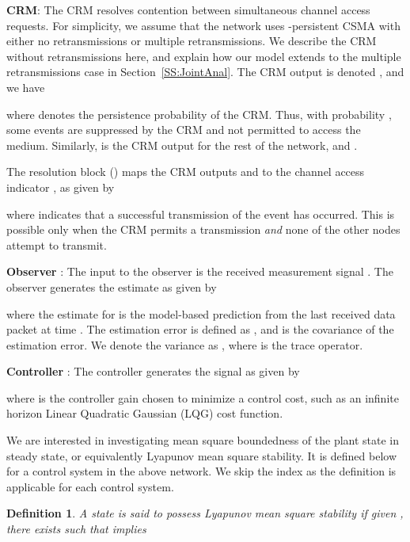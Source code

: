 \documentclass[twocolumn]{autart}
\newtheorem{definition}{Definition}[section]
\begin{document}
\noindent \textbf{CRM}: The CRM resolves contention between simultaneous channel access requests. For simplicity, we assume that the network uses -persistent CSMA with either no retransmissions or multiple retransmissions. We describe the CRM without retransmissions here, and explain how our model extends to the multiple retransmissions case in Section~\ref{SS:JointAnal}. The CRM output is denoted , and we have

where  denotes the persistence probability of the CRM. Thus, with probability , some events are suppressed by the CRM and not permitted to access the medium. Similarly,  is the CRM output for the rest of the network, and .

The resolution block () maps the CRM outputs  and  to the channel access indicator , as given by

where  indicates that a successful transmission of the event has occurred. This is possible only when the CRM permits a transmission \emph{and} none of the other nodes attempt to transmit.

\noindent \textbf{Observer} : The input to the observer is the received measurement signal . The observer generates the estimate  as given by

where the estimate for  is the model-based prediction from the last received data packet at time . The estimation error is defined as , and  is the covariance of the estimation error. We denote the variance as , where  is the trace operator.

\noindent \textbf{Controller} : The controller generates the signal  as given by

where  is the controller gain chosen to minimize a control cost, such as an infinite horizon Linear Quadratic Gaussian (LQG) cost function. 

We are interested in investigating mean square boundedness of the plant state in steady state, or equivalently Lyapunov mean square stability. It is defined below for a control system in the above network. We skip the index  as the definition is applicable for each control system.
\begin{definition} \textbf{} \label{Def:MSS}
A state is said to possess Lyapunov mean square stability if given , there exists  such that  implies

\end{definition}
\end{document}
